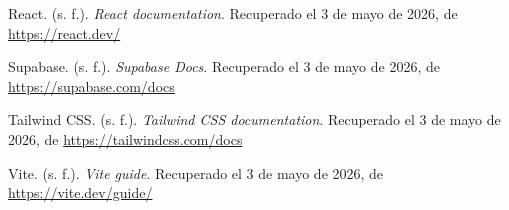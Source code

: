 \documentclass[12pt,letterpaper]{article}
\begin{document}
React. (s. f.). \textit{React documentation}. Recuperado el 3 de mayo de 2026, de \url{https://react.dev/}

Supabase. (s. f.). \textit{Supabase Docs}. Recuperado el 3 de mayo de 2026, de \url{https://supabase.com/docs}

Tailwind CSS. (s. f.). \textit{Tailwind CSS documentation}. Recuperado el 3 de mayo de 2026, de \url{https://tailwindcss.com/docs}

Vite. (s. f.). \textit{Vite guide}. Recuperado el 3 de mayo de 2026, de \url{https://vite.dev/guide/}
\end{document}
